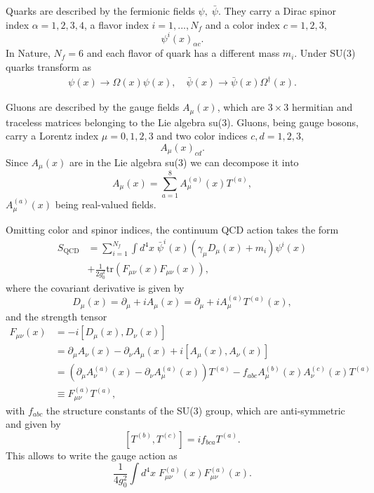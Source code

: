 Quarks are described by the fermionic fields $\psi,\;\bar{\psi}$. They carry a Dirac spinor index $\alpha=1,2,3,4$, a flavor index $i=1,...,N_f$ and a color index $c=1,2,3$,
\begin{equation}
\psi^i(x)_{\alpha c}.
\end{equation} 
In Nature, $N_f=6$ and each flavor of quark has a different mass $m_i$. Under SU(3) quarks transform as
\begin{gather}
\psi(x)\rightarrow\Omega(x)\psi(x), \quad
\bar{\psi}(x)\to\bar{\psi}(x)\Omega^{\dagger}(x).
\end{gather}

Gluons are described by the gauge fields $A_{\mu}(x)$, which are $3\times 3$ hermitian and traceless matrices belonging to the Lie algebra su(3). Gluons, being gauge bosons, carry a Lorentz index $\mu=0,1,2,3$ and two color indices $c,d=1,2,3$,
\begin{equation}
A_{\mu}(x)_{cd}.
\end{equation}
Since $A_{\mu}(x)$ are in the Lie algebra su(3) we can decompose it into
\begin{equation}
A_{\mu}(x)=\sum_{a=1}^8A_{\mu}^{(a)}(x)T^{(a)},
\end{equation}
$A_{\mu}^{(a)}(x)$ being real-valued fields.

Omitting color and spinor indices, the continuum QCD action takes the form
\begin{align}
\label{ch_foundation:eq:QCD}
S_{\textrm{QCD}}&=\sum_{i=1}^{N_f}\int d^4x\;\bar{\psi}^i(x)\left(\gamma_{\mu}D_{\mu}(x)+m_i\right)\psi^i(x)\\&+\frac{1}{2g_0^2}{\textrm{tr}}\left(F_{\mu\nu}(x)F_{\mu\nu}(x)\right),
\end{align}
where the covariant derivative is given by
\begin{equation}
D_{\mu}(x)=\partial_{\mu}+iA_{\mu}(x)=\partial_{\mu}+iA_{\mu}^{(a)}T^{(a)}(x),
\end{equation}
and the strength tensor
\begin{align}
F_{\mu\nu}(x)&=-i\left[D_{\mu}(x),D_{\nu}(x)\right]\\&=\partial_{\mu}A_{\nu}(x)-\partial_{\nu}A_{\mu}(x)+i\left[A_{\mu}(x),A_{\nu}(x)\right] \\
&=\left(\partial_{\mu}A_{\nu}^{(a)}(x)-\partial_{\nu}A_{\mu}^{(a)}(x)\right)T^{(a)}-f_{abc}A_{\mu}^{(b)}(x)A_{\nu}^{(c)}(x)T^{(a)} \\
&\equiv F_{\mu\nu}^{(a)}T^{(a)},
\end{align}
with $f_{abc}$ the structure constants of the SU(3) group, which are anti-symmetric and given by
\begin{equation}
\left[T^{(b)},T^{(c)}\right]=if_{bca}T^{(a)}.
\end{equation}
This allows to write the gauge action as
\begin{equation}
\frac{1}{4g_0^2}\int d^4x\;F_{\mu\nu}^{(a)}(x)F_{\mu\nu}^{(a)}(x).
\end{equation}

